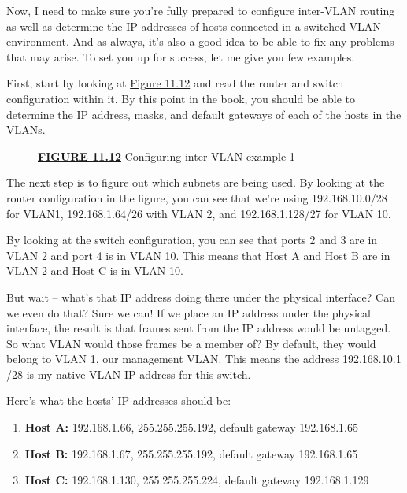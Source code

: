Now, I need to make sure you're fully prepared to configure inter-VLAN
routing as well as determine the IP addresses of hosts connected in a
switched VLAN environment. And as always, it's also a good idea to be
able to fix any problems that may arise. To set you up for success, let
me give you few examples.

First, start by looking at
\protect\hyperlink{c11.xhtmlux5cux23figure11-12}{Figure 11.12} and read
the router and switch configuration within it. By this point in the
book, you should be able to determine the IP address, masks, and default
gateways of each of the hosts in the VLANs.



\begin{figure}
\centering
\caption{{\protect\hyperlink{c11.xhtmlux5cux23figureanchor11-12}{\textbf{FIGURE
11.12}} Configuring inter-VLAN example 1}}
\end{figure}

The next step is to figure out which subnets are being used. By looking
at the router configuration in the figure, you can see that we're using
192.168.10.0/28 for VLAN1, 192.168.1.64/26 with VLAN 2, and
192.168.1.128/27 for VLAN 10.

By looking at the switch configuration, you can see that ports 2 and 3
are in VLAN 2 and port 4 is in VLAN 10. This means that Host A and Host
B are in VLAN 2 and Host C is in VLAN 10.

But wait -- what's that IP address doing there under the physical
interface? Can we even do that? Sure we can! If we place an IP address
under the physical interface, the result is that frames sent from the IP
address would be untagged. So what VLAN would those frames be a member
of? By default, they would belong to VLAN 1, our management VLAN. This
means the address 192.168.10.1 /28 is my native VLAN IP address for this
switch.

Here's what the hosts' IP addresses should be:

\begin{enumerate}
\tightlist
\item
  \textbf{Host A:} 192.168.1.66, 255.255.255.192, default gateway
  192.168.1.65
\item
  \textbf{Host B:} 192.168.1.67, 255.255.255.192, default gateway
  192.168.1.65
\item
  \textbf{Host C:} 192.168.1.130, 255.255.255.224, default gateway
  192.168.1.129
\end{enumerate}

